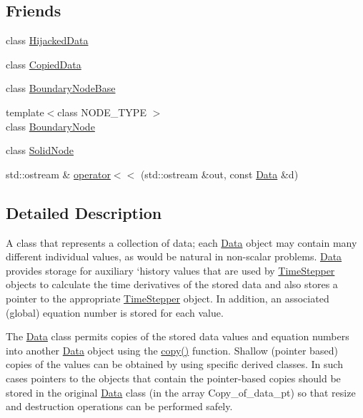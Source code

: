 \subsection*{Friends}
\begin{DoxyCompactItemize}
\item 
class \hyperlink{classoomph_1_1Data_a45b7c97b9e9c5f94eb2a9efeae2dbc08}{Hijacked\+Data}
\item 
class \hyperlink{classoomph_1_1Data_a68cfdb0f861066a7be74be2524466388}{Copied\+Data}
\item 
class \hyperlink{classoomph_1_1Data_a3d5c6d911301ca1704ce34955d8b3c6b}{Boundary\+Node\+Base}
\item 
{\footnotesize template$<$class N\+O\+D\+E\+\_\+\+T\+Y\+PE $>$ }\\class \hyperlink{classoomph_1_1Data_a75261ed432ecec54f676ec5bb0db4d5a}{Boundary\+Node}
\item 
class \hyperlink{classoomph_1_1Data_afe40e893f1c68d80f58bdbfc1e1d3cdc}{Solid\+Node}
\item 
std\+::ostream \& \hyperlink{classoomph_1_1Data_abad7fa6bf4988e5a0336ba3ce71b5147}{operator$<$$<$} (std\+::ostream \&out, const \hyperlink{classoomph_1_1Data}{Data} \&d)
\end{DoxyCompactItemize}


\subsection{Detailed Description}
A class that represents a collection of data; each \hyperlink{classoomph_1_1Data}{Data} object may contain many different individual values, as would be natural in non-\/scalar problems. \hyperlink{classoomph_1_1Data}{Data} provides storage for auxiliary `history\textquotesingle{} values that are used by \hyperlink{classoomph_1_1TimeStepper}{Time\+Stepper} objects to calculate the time derivatives of the stored data and also stores a pointer to the appropriate \hyperlink{classoomph_1_1TimeStepper}{Time\+Stepper} object. In addition, an associated (global) equation number is stored for each value. 

The \hyperlink{classoomph_1_1Data}{Data} class permits copies of the stored data values and equation numbers into another \hyperlink{classoomph_1_1Data}{Data} object using the \hyperlink{classoomph_1_1Data_a57889a9db7ca009434f0268173fcf3f8}{copy()} function. Shallow (pointer based) copies of the values can be obtained by using specific derived classes. In such cases pointers to the objects that contain the pointer-\/based copies should be stored in the original \hyperlink{classoomph_1_1Data}{Data} class (in the array Copy\+\_\+of\+\_\+data\+\_\+pt) so that resize and destruction operations can be performed safely. 

